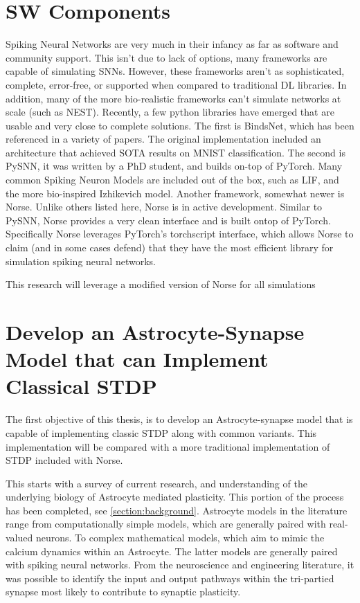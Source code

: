     \section{SW Components}
    Spiking Neural Networks are very much in their infancy as far as software
    and community support. This isn't due to lack of options, many frameworks
    are capable of simulating SNNs. However, these frameworks aren't as
    sophisticated, complete, error-free, or supported when compared to
    traditional DL libraries. In addition, many of the more bio-realistic
    frameworks can't simulate networks at scale (such as NEST). Recently, a few
    python libraries have emerged that are usable and very close to complete
    solutions. The first is BindsNet, which has been referenced in a variety of
    papers. The original implementation included an architecture that achieved
    SOTA results on MNIST classification. The second is PySNN, it was written by
    a PhD student, and builds on-top of PyTorch. Many common Spiking Neuron
    Models are included out of the box, such as LIF, and the more bio-inspired
    Izhikevich model. Another framework, somewhat newer is Norse. Unlike others
    listed here, Norse is in active development. Similar to PySNN, Norse
    provides a very clean interface and is built ontop of PyTorch. Specifically
    Norse leverages PyTorch's torchscript interface, which allows Norse to claim
    (and in some cases defend) that they have the most efficient library for
    simulation spiking neural networks.

    This research will leverage a modified version of Norse for all simulations
    
    \section{Develop an Astrocyte-Synapse Model that can Implement Classical STDP}
    
    The first objective of this thesis, is to develop an Astrocyte-synapse model
    that is capable of implementing classic STDP along with common
    variants. This implementation will be compared with a more traditional
    implementation of STDP included with Norse.
    
    This starts with a survey of current research, and understanding of the
    underlying biology of Astrocyte mediated plasticity. This portion of the
    process has been completed, see \ref{section:background}. Astrocyte models
    in the literature range from computationally simple models, which are
    generally paired with real-valued neurons. To complex mathematical models,
    which aim to mimic the calcium dynamics within an Astrocyte. The latter
    models are generally paired with spiking neural networks. From the
    neuroscience and engineering literature, it was possible to identify the
    input and output pathways within the tri-partied synapse most likely to
    contribute to synaptic plasticity.
    

